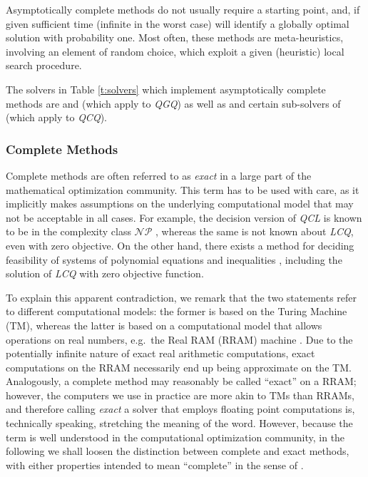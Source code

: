 Asymptotically complete methods do not usually require a starting point, and, if given sufficient time (infinite in the worst case) will identify a globally optimal solution with probability one. Most often, these methods are meta-heuristics, involving an element of random choice, which exploit a given (heuristic) local search procedure.

The solvers in Table \ref{t:solvers} which implement asymptotically complete methods are \oqnlp and \knitro (which apply to \textit{QGQ}) as well as \msnlp and certain sub-solvers of \lgo (which apply to \textit{QCQ}).


\subsubsection{Complete Methods}\label{s:complete}

Complete methods are often referred to as \emph{exact} in a large part of the mathematical optimization community. This term has to be used with care, as it implicitly makes assumptions on the underlying computational model that may not be acceptable in all cases. For example, the decision version of \textit{QCL} is known to be in the complexity class $\mathcal{NP}$ \cite{vavasis90a}, whereas the same is not known about \textit{LCQ}, even with zero objective. On the other hand, there exists a method for deciding feasibility of systems of polynomial equations and inequalities \cite{tarski-reals}, including the solution of \textit{LCQ} with zero objective function.

To explain this apparent contradiction, we remark that the two statements refer to different computational models: the former is based on the Turing Machine (TM), whereas the latter is based on a computational model that allows operations on real numbers, e.g.~the Real RAM (RRAM) machine \cite{blum}. Due to the potentially infinite nature of exact real arithmetic computations, exact computations on the RRAM necessarily end up being approximate on the TM. Analogously, a complete method may reasonably be called ``exact'' on a RRAM; however, the computers we use in practice are more akin to TMs than RRAMs, and therefore calling \emph{exact} a solver that employs floating point computations is, technically speaking, stretching the meaning of the word. However, because the term is well understood in the computational optimization community, in the following we shall loosen the distinction between complete and exact methods, with either properties intended to mean ``complete'' in the sense of \cite{neumaier}.

